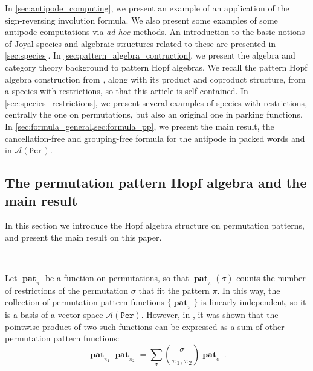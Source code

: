 \documentclass[12pt, reqno]{amsart}
\theoremstyle{definition}
\DeclareMathOperator{\pat}{\mathbf{pat}}
\begin{document}
In \cref{sec:antipode_computing}, we present an example of an application of the sign-reversing involution formula.
We also present some examples of some antipode computations via \textit{ad hoc} methods. An introduction to the basic notions of Joyal species and algebraic structures related to these are presented in \cref{sec:species}. In \cref{sec:pattern_algebra_contruction}, we present the algebra and category theory background to pattern Hopf algebras. We recall the pattern Hopf algebra construction from \cite{Penaguiao2020}, along with its product and coproduct structure, from a species with restrictions, so that this article is self contained.
In \cref{sec:species_restrictions}, we present several examples of species with restrictions, centrally the one on permutations, but also an original one in parking functions.
In \cref{sec:formula_general,sec:formula_pp}, we present the main result, the cancellation-free and grouping-free formula for the antipode in packed words and in $\mathcal{A}(\mathtt{Per})$.
\subsection{The permutation pattern Hopf algebra and the main result}

In this section we introduce the Hopf algebra structure on permutation patterns, and present the main result on this paper.

\

Let $\pat_{\pi}$ be a function on permutations, so that $\pat_{\pi}(\sigma)$ counts the number of restrictions of the permutation $\sigma$ that fit the pattern $\pi$.
In this way, the collection of permutation pattern functions $\{\pat_{\pi}\}$ is linearly independent, so it is a basis of a vector space $\mathcal A (\mathtt{Per})$.
However, in \cite{Vargas}, it was shown that the pointwise product of two such functions can be expressed as a sum of other permutation pattern functions:
\begin{equation}\label{eq:prodperm}
\pat_{\pi_1} \pat_{\pi_2} = \sum_{\sigma} \binom{\sigma}{\pi_1, \pi_2} \pat_{\sigma} \, .
\end{equation}
\end{document}
